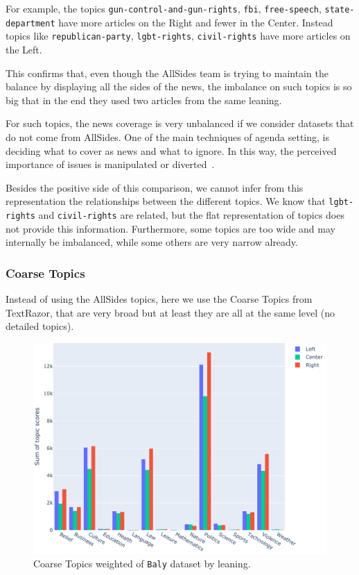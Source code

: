 For example, the topics \texttt{gun-control-and-gun-rights}, \texttt{fbi}, \texttt{free-speech}, \texttt{state-department} have more articles on the Right and fewer in the Center. Instead topics like \texttt{republican-party}, \texttt{lgbt-rights}, \texttt{civil-rights} have more articles on the Left.

This confirms that, even though the AllSides team is trying to maintain the balance by displaying all the sides of the news, the imbalance on such topics is so big that in the end they used two articles from the same leaning.

For such topics, the news coverage is very unbalanced if we consider datasets that do not come from AllSides.
One of the main techniques of agenda setting, is deciding what to cover as news and what to ignore. In this way, the perceived importance of issues is manipulated or diverted~\citep{mccombs1972agenda}.

Besides the positive side of this comparison, we cannot infer from this representation the relationships between the different topics.
We know that \texttt{lgbt-rights} and \texttt{civil-rights} are related, but the flat representation of topics does not provide this information.
Furthermore, some topics are too wide and may internally be imbalanced, while some others are very narrow already.

\subsubsection{\statusgreen Coarse Topics}

Instead of using the AllSides topics, here we use the Coarse Topics from TextRazor, that are very broad but at least they are all at the same level (no detailed topics).

\begin{figure}[!htbp]
    \centering
    \includegraphics[width=\linewidth]{figures/baly_coarse_weighted_by_leaning.pdf}
    \caption{Coarse Topics weighted of \texttt{Baly} dataset by leaning.}
    \label{fig:baly_coarse_weighted_by_leaning}
\end{figure}

